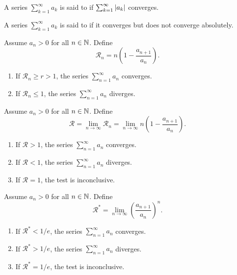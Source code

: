 \begin{definition}
  A series $\sum_{k = 1}^{\infty} a_k$ is said to  if $\sum_{k = 1}^{\infty} | a_k |$ converges.
\end{definition}

\begin{definition}
  A series $\sum_{k = 1}^{\infty} a_k$ is said to  if it converges but does not converge absolutely.
\end{definition}

\begin{proposition}
  Assume $a_n > 0$ for all $n \in \mathbb N$. Define
  \[ \mathcal{R}_n = n \left(1 - \frac{a_{n + 1}}{a_n}\right). \]
  \begin{enumerate}
    \item If $\mathcal{R}_n \geq r > 1$, the series $\sum_{n =
      1}^{\infty} a_n$ converges.
    \item If $\mathcal{R}_n \leq 1$, the series $\sum_{n =
      1}^{\infty} a_n$ diverges.
  \end{enumerate}
\end{proposition}

\begin{proposition}
  Assume $a_n > 0$ for all $n \in \mathbb N$. Define
  \[ \mathcal{R} = \lim_{n \to \infty} \mathcal{R}_n = \lim_{n \to
  \infty} n \left(1 - \frac{a_{n + 1}}{a_n}\right). \]
  \begin{enumerate}
    \item If $\mathcal{R} > 1$, the series $\sum_{n = 1}^{\infty}
      a_n$ converges.
    \item If $\mathcal{R} < 1$, the series $\sum_{n = 1}^{\infty} a_n$ diverges.
    \item If $\mathcal{R} = 1$, the test is inconclusive.
  \end{enumerate}
\end{proposition}

\begin{proposition}
  Assume $a_n > 0$ for all $n \in \mathbb N$. Define
  \[ \mathcal{R}^\ast = \lim_{n \to \infty} \left(\frac{a_{n +
  1}}{a_n}\right)^n. \]
  \begin{enumerate}
    \item If $\mathcal{R}^\ast < 1/e$, the series $\sum_{n = 1}^{\infty}
      a_n$ converges.
    \item If $\mathcal{R}^\ast > 1/e$, the series $\sum_{n =
      1}^{\infty} a_n$ diverges.
    \item If $\mathcal{R}^\ast = 1/e$, the test is inconclusive.
  \end{enumerate}
\end{proposition}

